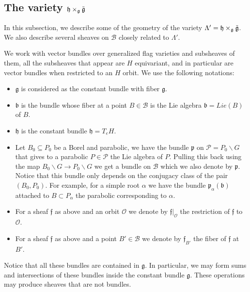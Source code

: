 \documentclass[12pt]{article}
\newcommand{\B}{\mathcal{B}}
\newcommand{\s}{\mathcal{O}}
\theoremstyle{plain}
\theoremstyle{definition}
\begin{document}
\subsection{The variety $\mathfrak{h} \times_{\mathfrak{g}}\Tilde{\mathfrak{g}}$}

In this subsection, we describe some of the geometry of the variety $\Lambda'=\mathfrak{h} \times_{\mathfrak{g}}\Tilde{\mathfrak{g}}$. We also describe several sheaves on $\B$ closely related to $\Lambda'$.

We work with vector bundles over generalized flag varieties and subsheaves of them, all the subsheaves that appear are $H$ equivariant, and in particular are vector bundles when restricted to an $H$ orbit. We use the following notations:

\begin{itemize}
    \item $\mathfrak{g}$ is considered as the constant bundle with fiber $\mathfrak{g}$.
    \item $\mathfrak{b}$ is the bundle whose fiber at a point $B\in \B$ is the Lie algebra $\mathfrak{b}=Lie(B)$ of $B$. 
    \item $\mathfrak{h}$ is the constant bundle $\mathfrak{h}=T_{e}H$.
    
    \item Let $B_0\subseteq P_0$ be a Borel and parabolic, we have the bundle $\mathfrak{p}$ on $\mathcal{P}=P_0\backslash G$ that gives to a parabolic $P\in \mathcal{P}$ the Lie algebra of $P$. Pulling this back using the map $B_0\backslash G\to P_0\backslash G$ we get a bundle on $\B$ which we also denote by $\mathfrak{p}$. Notice that this bundle only depends on the conjugacy class of the pair $(B_0,P_{0})$. For example, for a simple root $\alpha$ we have the bundle $\mathfrak{p}_\alpha(\mathfrak{b})$ attached to $B\subset P_\alpha$ the parabolic corresponding to $\alpha$.
    
    \item For a sheaf $\mathfrak{f}$ as above and an orbit $\s$ we denote by $\mathfrak{f}|_\s$ the restriction of $\mathfrak{f}$ to $\s$.

    \item For a sheaf $\mathfrak{f}$ as above and a point $B'\in \B$ we denote by $\mathfrak{f}_{B'}$ the fiber of $\mathfrak{f}$ at $B'$.
\end{itemize}


Notice that all these bundles are contained in $\mathfrak{g}$. In particular, we may form sums and intersections of these bundles inside the constant bundle $\mathfrak{g}$. These operations may produce sheaves that are not bundles. 
\end{document}
